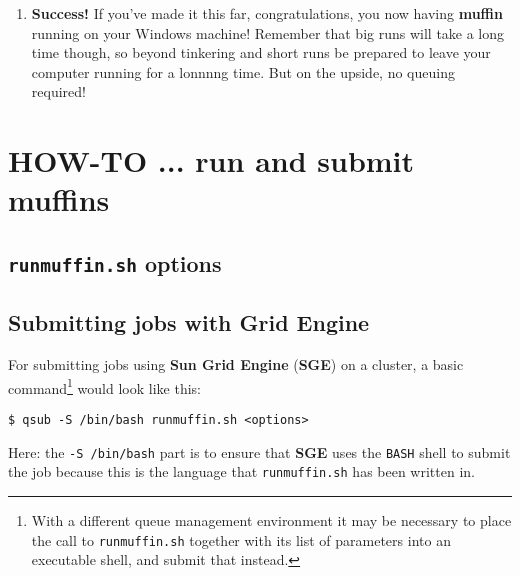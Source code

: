 \documentclass[11pt,fleqn]{book} %
\begin{document}
\begin{enumerate}[noitemsep]
\vspace{2mm}
\item \textbf{Success!} If you’ve made it this far, congratulations,
  you now having \textbf{muffin} running on your Windows machine!
  Remember that big runs will take a long time though, so beyond
  tinkering and short runs be prepared to leave your computer running
  for a lonnnng time. But on the upside, no queuing required!

\end{enumerate}


\newpage


\section{HOW-TO ... run and submit muffins}
\vspace{2mm}


\subsection*{\texttt{runmuffin.sh} options}
\vspace{2mm}



\vspace{20mm}



\subsection*{Submitting jobs with Grid Engine}\label{how-to-sge}
\vspace{2mm}


For submitting jobs using \textbf{Sun Grid Engine} (\textbf{SGE}) on a cluster, a basic command\footnote{With a different queue management environment it may be necessary to place the call to \texttt{runmuffin.sh} together with its list of parameters into an executable shell, and submit that instead. } would look like this:
\vspace{-2pt}\begin{verbatim}
$ qsub -S /bin/bash runmuffin.sh <options>
\end{verbatim}\vspace{-2pt}
Here: the \texttt{-S /bin/bash} part is to ensure that \textbf{SGE} uses the \texttt{BASH} shell to submit the job because this is the language that \texttt{runmuffin.sh} has been written in.
\end{document}
